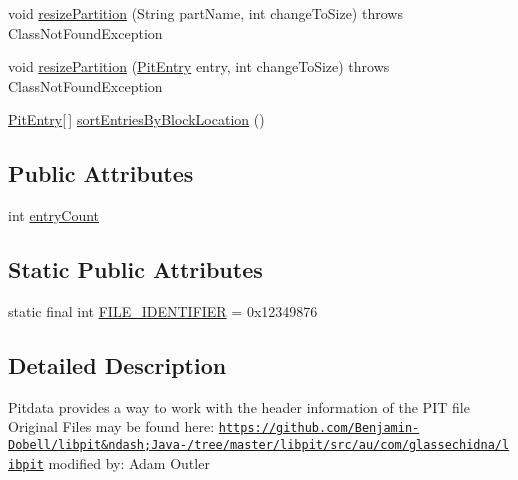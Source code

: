 \begin{DoxyCompactItemize}
\item 
void \hyperlink{class_c_a_s_u_a_l_1_1archiving_1_1libpit_1_1_pit_data_ad9bf38702c94c0e25ea1e2175a14e8c8}{resize\-Partition} (String part\-Name, int change\-To\-Size)  throws Class\-Not\-Found\-Exception 
\item 
void \hyperlink{class_c_a_s_u_a_l_1_1archiving_1_1libpit_1_1_pit_data_ac5958719c4de4485093dd5d7a6ca1c65}{resize\-Partition} (\hyperlink{class_c_a_s_u_a_l_1_1archiving_1_1libpit_1_1_pit_entry}{Pit\-Entry} entry, int change\-To\-Size)  throws Class\-Not\-Found\-Exception 
\item 
\hyperlink{class_c_a_s_u_a_l_1_1archiving_1_1libpit_1_1_pit_entry}{Pit\-Entry}\mbox{[}$\,$\mbox{]} \hyperlink{class_c_a_s_u_a_l_1_1archiving_1_1libpit_1_1_pit_data_aad4e04c99c61973ec42a1737dd6f156a}{sort\-Entries\-By\-Block\-Location} ()
\end{DoxyCompactItemize}
\subsection*{Public Attributes}
\begin{DoxyCompactItemize}
\item 
int \hyperlink{class_c_a_s_u_a_l_1_1archiving_1_1libpit_1_1_pit_data_a2532f4f5a317e6e8014f06d0f4625294}{entry\-Count}
\end{DoxyCompactItemize}
\subsection*{Static Public Attributes}
\begin{DoxyCompactItemize}
\item 
static final int \hyperlink{class_c_a_s_u_a_l_1_1archiving_1_1libpit_1_1_pit_data_ac0cd0f93311de091c28229ad1e9b1fee}{F\-I\-L\-E\-\_\-\-I\-D\-E\-N\-T\-I\-F\-I\-E\-R} = 0x12349876
\end{DoxyCompactItemize}


\subsection{Detailed Description}
Pitdata provides a way to work with the header information of the P\-I\-T file Original Files may be found here\-: \href{https://github.com/Benjamin-Dobell/libpit&ndash;Java-/tree/master/libpit/src/au/com/glassechidna/libpit}{\tt https\-://github.\-com/\-Benjamin-\/\-Dobell/libpit\&ndash;\-Java-\//tree/master/libpit/src/au/com/glassechidna/libpit} modified by\-: Adam Outler

